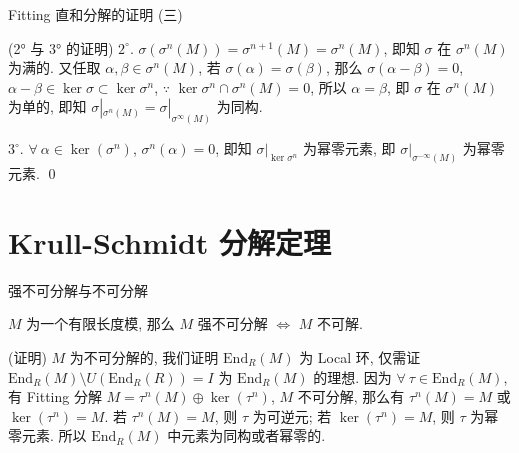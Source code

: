 \begin{frame}{Fitting 直和分解的证明 (三)}

\startproof[bg=yellow, fg=red](2° 与 3° 的证明)
$2^{\circ}$. $\sigma(\sigma^n(M)) = \sigma^{n+1}(M) = \sigma^n(M)$,
即知 $\sigma$ 在 $\sigma^n(M)$ 为满的.
又任取 $\alpha, \beta \in \sigma^n(M)$, 若 $\sigma(\alpha) = \sigma(\beta)$,
那么 $\sigma(\alpha - \beta) = 0$,
$\alpha - \beta \in \ker \sigma \subset \ker \sigma^n$,
$\because$ $\ker \sigma^n \cap \sigma^n(M) = 0$, 所以 $\alpha = \beta$,
即 $\sigma$ 在 $\sigma^n(M)$ 为单的,
即知 $\sigma|_{\sigma^n(M)} = \sigma|_{\sigma^{\infty}(M)}$ 为同构.

\pause

$3^{\circ}$. $\forall\ \alpha \in \ker(\sigma^n)$, $\sigma^n(\alpha) = 0$,
即知 $\sigma|_{\ker \sigma^n}$ 为幂零元素,
即 $\sigma|_{\sigma^{-\infty}(M)}$ 为幂零元素.
\qed

\end{frame}


\section[分解定理]{Krull-Schmidt 分解定理}


\begin{frame}{强不可分解与不可分解}

\begin{cor}[强不可分解与不可分解]
$M$ 为一个有限长度模, 那么 $M$ 强不可分解 $\iff$ $M$ 不可解.
\end{cor}


\startproof[bg=yellow, fg=red](证明)
$M$ 为不可分解的, 我们证明 $\mathrm{End}_R(M)$ 为 Local 环,
仅需证 $\mathrm{End}_R(M) \setminus U(\mathrm{End}_R(R)) = I$ 为 $\mathrm{End}_R(M)$ 的理想.
因为 $\forall\ \tau \in \mathrm{End}_R(M)$, 有 Fitting 分解
$M = \tau^n(M) \oplus \ker(\tau^n)$,
$M$ 不可分解, 那么有 $\tau^n(M) = M$ 或 $\ker(\tau^n) = M$.
若 $\tau^n(M) = M$, 则 $\tau$ 为可逆元; 若 $\ker(\tau^n) = M$, 则 $\tau$ 为幂零元素.
所以 $\mathrm{End}_R(M)$ 中元素为同构或者幂零的.

\end{frame}



